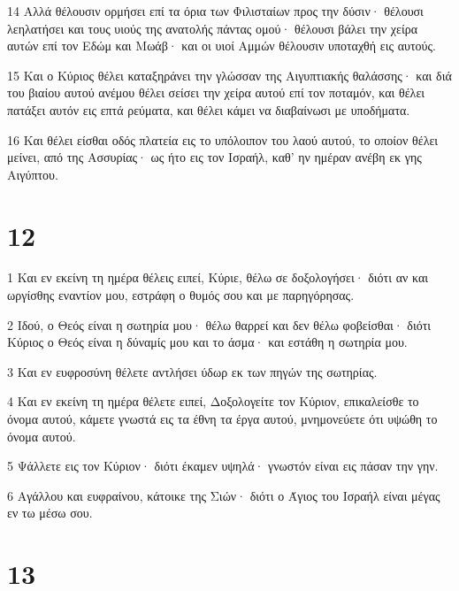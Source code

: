 \par 14 Αλλά θέλουσιν ορμήσει επί τα όρια των Φιλισταίων προς την δύσιν· θέλουσι λεηλατήσει και τους υιούς της ανατολής πάντας ομού· θέλουσι βάλει την χείρα αυτών επί τον Εδώμ και Μωάβ· και οι υιοί Αμμών θέλουσιν υποταχθή εις αυτούς.
\par 15 Και ο Κύριος θέλει καταξηράνει την γλώσσαν της Αιγυπτιακής θαλάσσης· και διά του βιαίου αυτού ανέμου θέλει σείσει την χείρα αυτού επί τον ποταμόν, και θέλει πατάξει αυτόν εις επτά ρεύματα, και θέλει κάμει να διαβαίνωσι με υποδήματα.
\par 16 Και θέλει είσθαι οδός πλατεία εις το υπόλοιπον του λαού αυτού, το οποίον θέλει μείνει, από της Ασσυρίας· ως ήτο εις τον Ισραήλ, καθ' ην ημέραν ανέβη εκ γης Αιγύπτου.

\chapter{12}

\par 1 Και εν εκείνη τη ημέρα θέλεις ειπεί, Κύριε, θέλω σε δοξολογήσει· διότι αν και ωργίσθης εναντίον μου, εστράφη ο θυμός σου και με παρηγόρησας.
\par 2 Ιδού, ο Θεός είναι η σωτηρία μου· θέλω θαρρεί και δεν θέλω φοβείσθαι· διότι Κύριος ο Θεός είναι η δύναμίς μου και το άσμα· και εστάθη η σωτηρία μου.
\par 3 Και εν ευφροσύνη θέλετε αντλήσει ύδωρ εκ των πηγών της σωτηρίας.
\par 4 Και εν εκείνη τη ημέρα θέλετε ειπεί, Δοξολογείτε τον Κύριον, επικαλείσθε το όνομα αυτού, κάμετε γνωστά εις τα έθνη τα έργα αυτού, μνημονεύετε ότι υψώθη το όνομα αυτού.
\par 5 Ψάλλετε εις τον Κύριον· διότι έκαμεν υψηλά· γνωστόν είναι εις πάσαν την γην.
\par 6 Αγάλλου και ευφραίνου, κάτοικε της Σιών· διότι ο Άγιος του Ισραήλ είναι μέγας εν τω μέσω σου.

\chapter{13}

